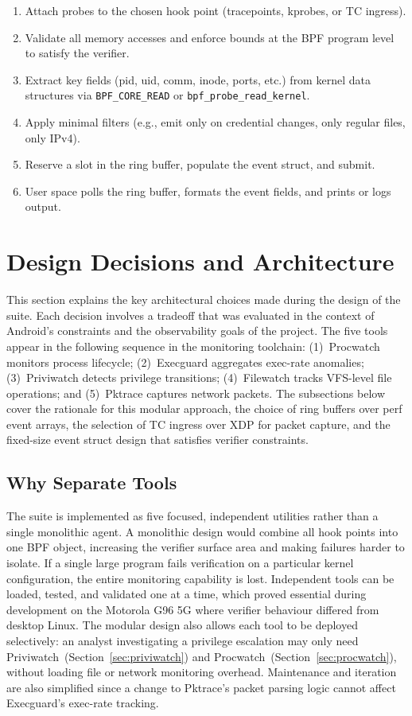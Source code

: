 \documentclass{mnitjaipur}
\begin{document}
\begin{enumerate}
  \item Attach probes to the chosen hook point (tracepoints, kprobes, or TC ingress).
  \item Validate all memory accesses and enforce bounds at the BPF program level to satisfy the verifier.
  \item Extract key fields (pid, uid, comm, inode, ports, etc.) from kernel data structures via \texttt{BPF\_CORE\_READ} or \texttt{bpf\_probe\_read\_kernel}.
  \item Apply minimal filters (e.g., emit only on credential changes, only regular files, only IPv4).
  \item Reserve a slot in the ring buffer, populate the event struct, and submit.
  \item User space polls the ring buffer, formats the event fields, and prints or logs output.
\end{enumerate}

\clearpage
\chapter{Design Decisions and Architecture}
\label{ch:design}
This section explains the key architectural choices made during the design of the suite. Each decision involves a tradeoff that was evaluated in the context of Android's constraints and the observability goals of the project. The five tools appear in the following sequence in the monitoring toolchain: (1)~Procwatch monitors process lifecycle; (2)~Execguard aggregates exec-rate anomalies; (3)~Priviwatch detects privilege transitions; (4)~Filewatch tracks VFS-level file operations; and (5)~Pktrace captures network packets. The subsections below cover the rationale for this modular approach, the choice of ring buffers over perf event arrays, the selection of TC ingress over XDP for packet capture, and the fixed-size event struct design that satisfies verifier constraints.

\section{Why Separate Tools}
The suite is implemented as five focused, independent utilities rather than a single monolithic agent. A monolithic design would combine all hook points into one BPF object, increasing the verifier surface area and making failures harder to isolate. If a single large program fails verification on a particular kernel configuration, the entire monitoring capability is lost. Independent tools can be loaded, tested, and validated one at a time, which proved essential during development on the Motorola G96 5G where verifier behaviour differed from desktop Linux. The modular design also allows each tool to be deployed selectively: an analyst investigating a privilege escalation may only need Priviwatch~(Section~\ref{sec:priviwatch}) and Procwatch~(Section~\ref{sec:procwatch}), without loading file or network monitoring overhead. Maintenance and iteration are also simplified since a change to Pktrace's packet parsing logic cannot affect Execguard's exec-rate tracking.
\end{document}
